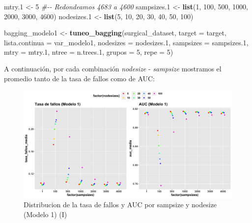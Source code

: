 \documentclass[
]{article}
\newenvironment{Shaded}{\begin{snugshade}}{\end{snugshade}}
\newcommand{\CommentTok}[1]{\textcolor[rgb]{0.56,0.35,0.01}{\textit{#1}}}
\newcommand{\DataTypeTok}[1]{\textcolor[rgb]{0.13,0.29,0.53}{#1}}
\newcommand{\DecValTok}[1]{\textcolor[rgb]{0.00,0.00,0.81}{#1}}
\newcommand{\FloatTok}[1]{\textcolor[rgb]{0.00,0.00,0.81}{#1}}
\newcommand{\KeywordTok}[1]{\textcolor[rgb]{0.13,0.29,0.53}{\textbf{#1}}}
\newcommand{\NormalTok}[1]{#1}
\newcommand{\StringTok}[1]{\textcolor[rgb]{0.31,0.60,0.02}{#1}}
\begin{document}
\begin{Shaded}
\begin{Highlighting}[]
\NormalTok{mtry}\FloatTok{.1}\NormalTok{      <{-}}\StringTok{ }\DecValTok{5}
\CommentTok{\#{-}{-} Redondeamos 4683 a 4600}
\NormalTok{sampsizes}\FloatTok{.1}\NormalTok{ <{-}}\StringTok{ }\KeywordTok{list}\NormalTok{(}\DecValTok{1}\NormalTok{, }\DecValTok{100}\NormalTok{, }\DecValTok{500}\NormalTok{, }\DecValTok{1000}\NormalTok{, }\DecValTok{2000}\NormalTok{, }\DecValTok{3000}\NormalTok{, }\DecValTok{4600}\NormalTok{)}
\NormalTok{nodesizes}\FloatTok{.1}\NormalTok{ <{-}}\StringTok{ }\KeywordTok{list}\NormalTok{(}\DecValTok{5}\NormalTok{, }\DecValTok{10}\NormalTok{, }\DecValTok{20}\NormalTok{, }\DecValTok{30}\NormalTok{, }\DecValTok{40}\NormalTok{, }\DecValTok{50}\NormalTok{, }\DecValTok{100}\NormalTok{)}

\NormalTok{bagging\_modelo1 <{-}}\StringTok{ }\KeywordTok{tuneo\_bagging}\NormalTok{(surgical\_dataset, }\DataTypeTok{target =}\NormalTok{ target,}
                                 \DataTypeTok{lista.continua =}\NormalTok{ var\_modelo1,}
                                 \DataTypeTok{nodesizes =}\NormalTok{ nodesizes}\FloatTok{.1}\NormalTok{,}
                                 \DataTypeTok{sampsizes =}\NormalTok{ sampsizes}\FloatTok{.1}\NormalTok{, }\DataTypeTok{mtry =}\NormalTok{ mtry}\FloatTok{.1}\NormalTok{,}
                                 \DataTypeTok{ntree =}\NormalTok{ n.trees}\FloatTok{.1}\NormalTok{, }\DataTypeTok{grupos =} \DecValTok{5}\NormalTok{, }\DataTypeTok{repe =} \DecValTok{5}\NormalTok{)}
\end{Highlighting}
\end{Shaded}

A continuación, por cada combinación \emph{nodesize} - \emph{sampsize}
mostramos el promedio tanto de la tasa de fallos como de AUC:

\begin{figure}[h!]

{\centering \includegraphics[width=0.99\linewidth,height=0.99\textheight,]{./charts/03_distribucion_auc_tasa_fallos_modelo1} 

}

\caption{Distribucion de la tasa de fallos y AUC por sampsize y nodesize (Modelo 1) (I)}\label{fig:unnamed-chunk-69}
\end{figure}
\end{document}
